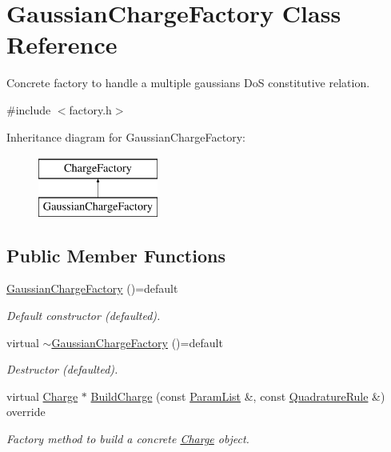 \hypertarget{classGaussianChargeFactory}{\section{Gaussian\-Charge\-Factory Class Reference}
\label{classGaussianChargeFactory}
}


Concrete factory to handle a multiple gaussians Do\-S constitutive relation.  




{\ttfamily \#include $<$factory.\-h$>$}

Inheritance diagram for Gaussian\-Charge\-Factory\-:\begin{figure}[H]
\begin{center}
\leavevmode
\includegraphics[height=2.000000cm]{classGaussianChargeFactory}
\end{center}
\end{figure}
\subsection*{Public Member Functions}
\begin{DoxyCompactItemize}
\item 
\hypertarget{classGaussianChargeFactory_aedb4a8bbdd1d9723ea5e732053fa8ffe}{\hyperlink{classGaussianChargeFactory_aedb4a8bbdd1d9723ea5e732053fa8ffe}{Gaussian\-Charge\-Factory} ()=default}\label{classGaussianChargeFactory_aedb4a8bbdd1d9723ea5e732053fa8ffe}

\begin{DoxyCompactList}\small\item\em Default constructor (defaulted). \end{DoxyCompactList}\item 
\hypertarget{classGaussianChargeFactory_a13ba2c7152c6f6c358afd62071c6e08b}{virtual \hyperlink{classGaussianChargeFactory_a13ba2c7152c6f6c358afd62071c6e08b}{$\sim$\-Gaussian\-Charge\-Factory} ()=default}\label{classGaussianChargeFactory_a13ba2c7152c6f6c358afd62071c6e08b}

\begin{DoxyCompactList}\small\item\em Destructor (defaulted). \end{DoxyCompactList}\item 
virtual \hyperlink{classCharge}{Charge} $\ast$ \hyperlink{classGaussianChargeFactory_a1e1718ca16c1624e98865bc6359c2136}{Build\-Charge} (const \hyperlink{classParamList}{Param\-List} \&, const \hyperlink{classQuadratureRule}{Quadrature\-Rule} \&) override
\begin{DoxyCompactList}\small\item\em Factory method to build a concrete \hyperlink{classCharge}{Charge} object. \end{DoxyCompactList}\end{DoxyCompactItemize}


